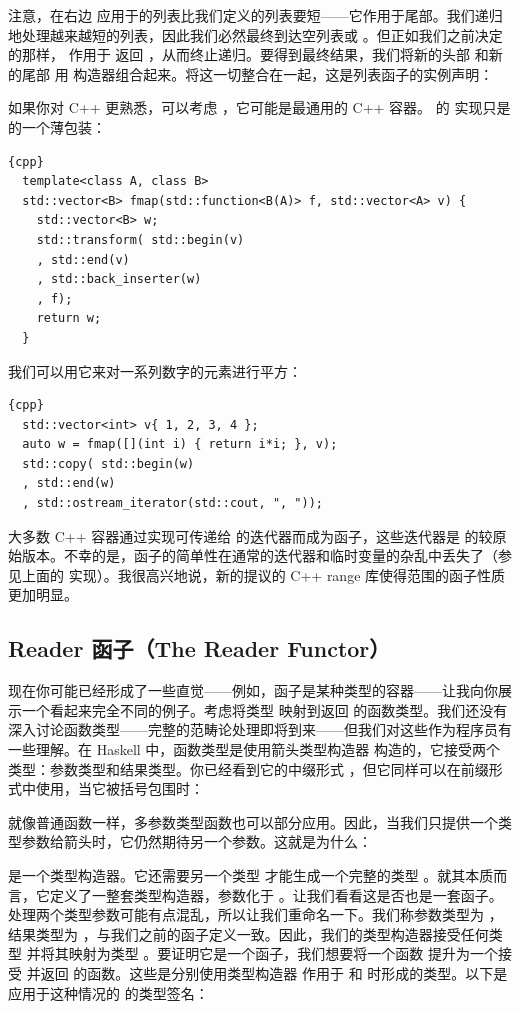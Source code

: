 注意，在右边  应用于的列表比我们定义的列表要短——它作用于尾部。我们递归地处理越来越短的列表，因此我们必然最终到达空列表或 。但正如我们之前决定的那样， 作用于  返回 ，从而终止递归。要得到最终结果，我们将新的头部  和新的尾部  用  构造器组合起来。将这一切整合在一起，这是列表函子的实例声明：

如果你对 C++ 更熟悉，可以考虑 ，它可能是最通用的 C++ 容器。 的  实现只是  的一个薄包装：

\begin{lstlisting}{cpp}
  template<class A, class B>
  std::vector<B> fmap(std::function<B(A)> f, std::vector<A> v) {
    std::vector<B> w;
    std::transform( std::begin(v)
    , std::end(v)
    , std::back_inserter(w)
    , f);
    return w;
  }
\end{lstlisting}
我们可以用它来对一系列数字的元素进行平方：

\begin{lstlisting}{cpp}
  std::vector<int> v{ 1, 2, 3, 4 };
  auto w = fmap([](int i) { return i*i; }, v);
  std::copy( std::begin(w)
  , std::end(w)
  , std::ostream_iterator(std::cout, ", "));
\end{lstlisting}
大多数 C++ 容器通过实现可传递给  的迭代器而成为函子，这些迭代器是  的较原始版本。不幸的是，函子的简单性在通常的迭代器和临时变量的杂乱中丢失了（参见上面的  实现）。我很高兴地说，新的提议的 C++ range 库使得范围的函子性质更加明显。

\subsection{Reader 函子（The Reader Functor）}

现在你可能已经形成了一些直觉——例如，函子是某种类型的容器——让我向你展示一个看起来完全不同的例子。考虑将类型  映射到返回  的函数类型。我们还没有深入讨论函数类型——完整的范畴论处理即将到来——但我们对这些作为程序员有一些理解。在 Haskell 中，函数类型是使用箭头类型构造器 \code{(->)} 构造的，它接受两个类型：参数类型和结果类型。你已经看到它的中缀形式 ，但它同样可以在前缀形式中使用，当它被括号包围时：

就像普通函数一样，多参数类型函数也可以部分应用。因此，当我们只提供一个类型参数给箭头时，它仍然期待另一个参数。这就是为什么：

是一个类型构造器。它还需要另一个类型  才能生成一个完整的类型 。就其本质而言，它定义了一整套类型构造器，参数化于 。让我们看看这是否也是一套函子。处理两个类型参数可能有点混乱，所以让我们重命名一下。我们称参数类型为 ，结果类型为 ，与我们之前的函子定义一致。因此，我们的类型构造器接受任何类型  并将其映射为类型 。要证明它是一个函子，我们想要将一个函数  提升为一个接受  并返回  的函数。这些是分别使用类型构造器  作用于  和  时形成的类型。以下是应用于这种情况的  的类型签名：

